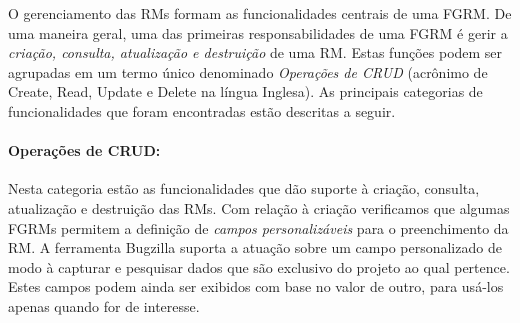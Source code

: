 \begin{table}[htpb]
\centering
{}
\caption{Frequência de cada categoria de funcionalidade no conjunto de cartões
	obtidos.}
\label{tab:freq_categorias_cartoes}
\end{table}

O gerenciamento das RMs formam as funcionalidades centrais de uma FGRM\@. De uma
maneira geral, uma das primeiras responsabilidades de uma FGRM é gerir a
\textit{criação, consulta, atualização e destruição} de uma RM\@. Estas funções
podem ser agrupadas em um termo único denominado \textit{Operações de CRUD}
(acrônimo de Create, Read, Update e Delete na língua Inglesa). As principais
categorias de funcionalidades que foram encontradas estão descritas a seguir.

\paragraph{Operações de CRUD:}
\label{par:operações_de_crud}

Nesta categoria estão as funcionalidades que dão suporte à criação,	consulta,
atualização e destruição das RMs. Com relação à criação verificamos que algumas
FGRMs permitem a definição de \textit{campos personalizáveis} para o
preenchimento da RM\@. A ferramenta Bugzilla suporta a atuação sobre um campo
personalizado de modo à capturar e pesquisar dados que são exclusivo do projeto
ao qual pertence. Estes campos podem ainda ser exibidos com base no valor de
outro, para usá-los apenas quando for de interesse.

